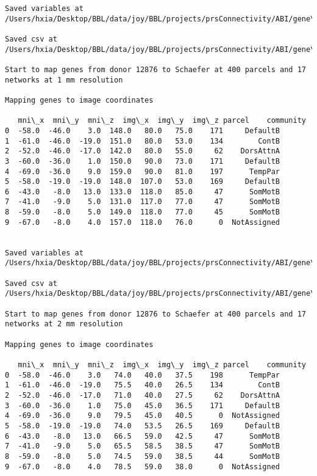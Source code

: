 \documentclass[11pt]{article}
\begin{document}
\begin{Verbatim}[commandchars=\\\{\}]
Saved variables at /Users/hxia/Desktop/BBL/data/joy/BBL/projects/prsConnectivity/ABI/gene\_mapping/12876donor\_400Parcels\_7Network\_2mm.pkl

Saved csv at /Users/hxia/Desktop/BBL/data/joy/BBL/projects/prsConnectivity/ABI/gene\_mapping/12876donor\_400Parcels\_7Network\_2mm.csv

Start to map genes from donor 12876 to Schaefer at 400 parcels and 17 networks at 1 mm resolution

Mapping genes to image coordinates

   mni\_x  mni\_y  mni\_z  img\_x  img\_y  img\_z parcel    community
0  -58.0  -46.0    3.0  148.0   80.0   75.0    171     DefaultB
1  -61.0  -46.0  -19.0  151.0   80.0   53.0    134        ContB
2  -52.0  -46.0  -17.0  142.0   80.0   55.0     62    DorsAttnA
3  -60.0  -36.0    1.0  150.0   90.0   73.0    171     DefaultB
4  -69.0  -36.0    9.0  159.0   90.0   81.0    197      TempPar
5  -58.0  -19.0  -19.0  148.0  107.0   53.0    169     DefaultB
6  -43.0   -8.0   13.0  133.0  118.0   85.0     47      SomMotB
7  -41.0   -9.0    5.0  131.0  117.0   77.0     47      SomMotB
8  -59.0   -8.0    5.0  149.0  118.0   77.0     45      SomMotB
9  -67.0   -8.0    4.0  157.0  118.0   76.0      0  NotAssigned


Saved variables at /Users/hxia/Desktop/BBL/data/joy/BBL/projects/prsConnectivity/ABI/gene\_mapping/12876donor\_400Parcels\_17Network\_1mm.pkl

Saved csv at /Users/hxia/Desktop/BBL/data/joy/BBL/projects/prsConnectivity/ABI/gene\_mapping/12876donor\_400Parcels\_17Network\_1mm.csv

Start to map genes from donor 12876 to Schaefer at 400 parcels and 17 networks at 2 mm resolution

Mapping genes to image coordinates

   mni\_x  mni\_y  mni\_z  img\_x  img\_y  img\_z parcel    community
0  -58.0  -46.0    3.0   74.0   40.0   37.5    198      TempPar
1  -61.0  -46.0  -19.0   75.5   40.0   26.5    134        ContB
2  -52.0  -46.0  -17.0   71.0   40.0   27.5     62    DorsAttnA
3  -60.0  -36.0    1.0   75.0   45.0   36.5    171     DefaultB
4  -69.0  -36.0    9.0   79.5   45.0   40.5      0  NotAssigned
5  -58.0  -19.0  -19.0   74.0   53.5   26.5    169     DefaultB
6  -43.0   -8.0   13.0   66.5   59.0   42.5     47      SomMotB
7  -41.0   -9.0    5.0   65.5   58.5   38.5     47      SomMotB
8  -59.0   -8.0    5.0   74.5   59.0   38.5     44      SomMotB
9  -67.0   -8.0    4.0   78.5   59.0   38.0      0  NotAssigned



\end{Verbatim}
\end{document}
